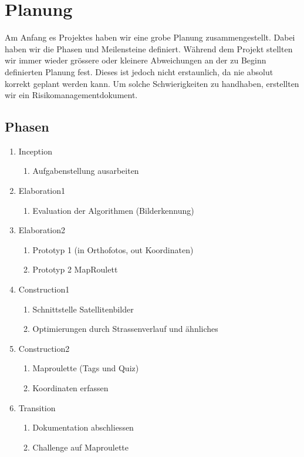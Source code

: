 \section{Planung}
Am Anfang es Projektes haben wir eine grobe Planung zusammengestellt. Dabei haben wir die Phasen und Meilensteine definiert. Während dem Projekt stellten wir immer wieder grössere oder kleinere Abweichungen an der zu Beginn definierten Planung fest. Dieses ist jedoch nicht erstaunlich, da nie absolut korrekt geplant werden kann. Um solche Schwierigkeiten zu handhaben, erstellten wir ein Risikomanagementdokument.

\subsection{Phasen}
\begin{enumerate}
  \item Inception
  \begin{enumerate}
    \item Aufgabenstellung ausarbeiten
  \end{enumerate}
  \item Elaboration1
  \begin{enumerate}
    \item Evaluation der Algorithmen (Bilderkennung)
  \end{enumerate}
  \item Elaboration2
  \begin{enumerate}
    \item Prototyp 1 (in Orthofotos, out Koordinaten)
    \item Prototyp 2 MapRoulett
  \end{enumerate}
  \item Construction1
  \begin{enumerate}
    \item Schnittstelle Satellitenbilder
    \item Optimierungen durch Strassenverlauf und ähnliches
  \end{enumerate}
  \item Construction2
  \begin{enumerate}
    \item Maproulette (Tags und Quiz)
    \item Koordinaten erfassen	
  \end{enumerate}
  \item Transition
  \begin{enumerate}
    \item Dokumentation abschliessen
    \item Challenge auf Maproulette
  \end{enumerate}
\end{enumerate}
\newpage

